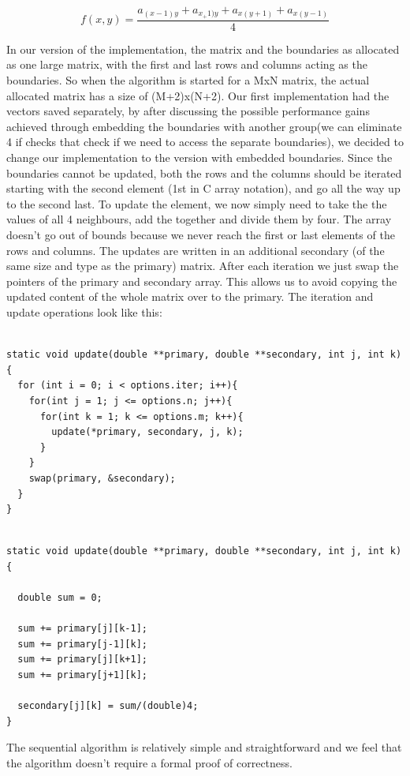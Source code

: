 \documentclass[11pt]{article}
\begin{document}
\[  f(x, y) = \frac{a_{(x-1)y} + a_{x_+1)y} + a_{x(y+1)} + a_{x(y-1)}}{4}  \]

In our version of the implementation, the matrix and the boundaries as allocated as one large matrix, with the first and last rows and columns acting
as the boundaries. So when the algorithm is started for a MxN matrix, the actual allocated matrix has a size of (M+2)x(N+2). Our first implementation had the vectors
saved separately, by after discussing the possible performance gains achieved through embedding the boundaries with another group(we can eliminate 4 if checks that check if we
need to access the separate boundaries), we decided to change our implementation to the version with embedded boundaries. Since the boundaries cannot be updated, both the rows and the columns
should be iterated starting with the second element (1st in C array notation), and go all the way up to the second last. To update the element, we now simply need to take the 
the values of all 4 neighbours, add the together and divide them by four. The array doesn't go out of bounds because we never reach the first or last elements of the rows and columns. 
The updates are written in an additional secondary (of the same size and type as the primary) matrix. After each iteration we just swap the pointers of the primary and secondary array. This
allows us to avoid copying the updated content of the whole matrix over to the primary.
The iteration and update operations look like this:
\begin{lstlisting}[label=some-code, caption=Iteration loop]

static void update(double **primary, double **secondary, int j, int k){
  for (int i = 0; i < options.iter; i++){
    for(int j = 1; j <= options.n; j++){
      for(int k = 1; k <= options.m; k++){
        update(*primary, secondary, j, k);
      }
    }
    swap(primary, &secondary);
  }
}
\end{lstlisting}
\begin{lstlisting}[label=some-code, caption=Update function]

static void update(double **primary, double **secondary, int j, int k){

  double sum = 0;

  sum += primary[j][k-1];
  sum += primary[j-1][k];
  sum += primary[j][k+1];
  sum += primary[j+1][k];

  secondary[j][k] = sum/(double)4;
}
\end{lstlisting}
The sequential algorithm is relatively simple and straightforward and we feel that the algorithm doesn't require a formal proof of correctness.
\end{document}
